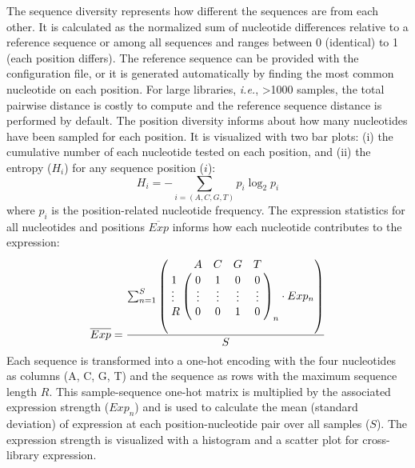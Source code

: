 \documentclass[utf8]{frontiersSCNS} %
\begin{document}
The sequence diversity represents how different the sequences are from each other. It is calculated as the normalized sum of nucleotide differences relative to a reference sequence or among all sequences and ranges between 0 (identical) to 1 (each position differs). The reference sequence can be provided with the configuration file, or it is generated automatically by finding the most common nucleotide on each position. For large libraries, \textit{i.e.}, >1000 samples, the total pairwise distance is costly to compute and the reference sequence distance is performed by default. The position diversity informs about how many nucleotides have been sampled for each position. It is visualized with two bar plots: (i) the cumulative number of each nucleotide tested on each position, and (ii) the entropy ($H_i$) for any sequence position ($i$):
\begin{equation}
H_i = -\sum_{i=(A,C,G,T)} p_i \log_2 p_i\label{eq:01} %
\end{equation}
where $p_i$ is the position-related nucleotide frequency. The expression statistics for all nucleotides and positions $\overline{Exp}$ informs how each nucleotide contributes to the expression:
\begin{equation*}
\overline{Exp} = \frac{\sum_{n=1}^{S}\left( \bordermatrix{~ & A & C & G & T \cr
              1 & 0 & 1 & 0 & 0 \cr
              \vdots & \vdots & \vdots & \vdots & \vdots\cr
              R & 0 & 0 & 1 & 0\cr
              }_n 
              \cdot Exp_n \right)}
              {S}
\end{equation*}
Each sequence is transformed into a one-hot encoding with the four nucleotides as columns (A, C, G, T) and the sequence as rows with the maximum sequence length $R$. This sample-sequence one-hot matrix is multiplied by the associated expression strength ($Exp_n$) and is used to calculate the mean (standard deviation) of expression at each position-nucleotide pair over all samples ($S$). The expression strength is visualized with a histogram and a scatter plot for cross-library expression.  
\end{document}

